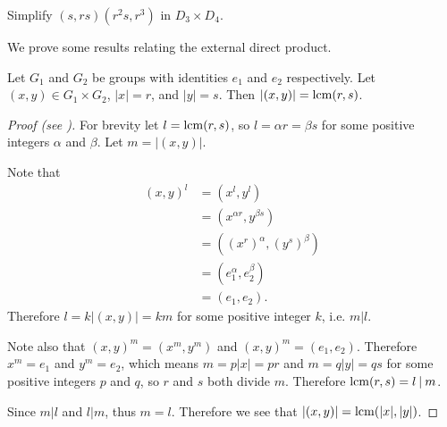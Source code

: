 \begin{exercise}
    Simplify $(s, rs)(r^2s, r^3)$ in $D_3 \times D_4$.
\end{exercise}

We prove some results relating the external direct product.
\begin{proposition}\label{prop-order-of-element-in-external-direct-product}
    Let $G_1$ and $G_2$ be groups with identities $e_1$ and $e_2$ respectively. Let $(x, y) \in G_1 \times G_2$, $|x| = r$, and $|y| = s$. Then $|(x, y)| = \mathrm{lcm}(r, s)$.
\end{proposition}
\begin{proof}[Proof (see \cite{proofwiki_orderofgroupelementinexternaldirectproduct})]
    For brevity let $l = \mathrm{lcm}(r, s)$, so $l = \alpha r = \beta s$ for some positive integers $\alpha$ and $\beta$. Let $m = |(x, y)|$.

    Note that
    \begin{align*}
        (x, y)^l &= (x^l, y^l)\\
        &= (x^{\alpha r}, y^{\beta s})\\
        &= \left((x^r)^\alpha, (y^s)^\beta\right)\\
        &= (e_1^\alpha, e_2^\beta)\\
        &= (e_1, e_2).
    \end{align*}
    Therefore $l = k|(x, y)| = km$ for some positive integer $k$, i.e. $m\vert l$.

    Note also that $(x, y)^m = (x^m, y^m)$ and $(x, y)^m = (e_1, e_2)$. Therefore $x^m = e_1$ and $y^m = e_2$, which means $m = p|x| = pr$ and $m = q|y| = qs$ for some positive integers $p$ and $q$, so $r$ and $s$ both divide $m$. Therefore $\lcm(r, s) = l\vert m$.

    Since $m\vert l$ and $l\vert m$, thus $m = l$. Therefore we see that $|(x, y)| = \mathrm{lcm}(|x|, |y|)$.
\end{proof}

